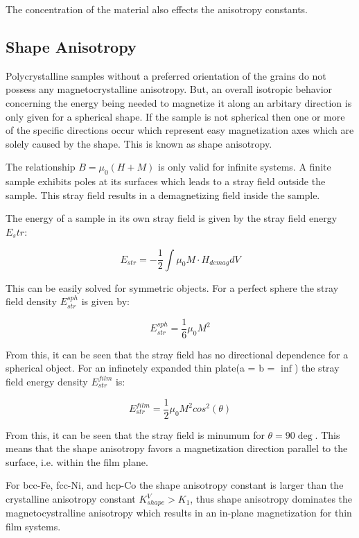 \documentclass[10pt]{article} %
\begin{document}
The concentration of the material also effects the anisotropy constants.


\subsection{Shape Anisotropy}
Polycrystalline samples without a preferred orientation of the grains do not possess any magnetocrystalline anisotropy. But, an overall isotropic behavior concerning the energy being needed to magnetize it along an arbitary direction is only given for a spherical shape. If the sample is not spherical then one or more of the specific directions occur which represent easy magnetization axes which are solely caused by the shape. This is known as shape anisotropy.

The relationship $B = \mu_0\left (H + M\right )$ is only valid for infinite systems. A finite sample exhibits poles at its surfaces which leads to a stray field outside the sample. This stray field results in a demagnetizing field inside the sample.

The energy of a sample in its own stray field is given by the stray field energy $E_str$:

\begin{equation}
E_{str} = - \frac{1}{2} \int \mu_0 M \cdot H_{demag} dV
\end{equation}

This can be easily solved for symmetric objects. For a perfect sphere the stray field density $E_{str}^{sph}$ is given by:

\begin{equation}
E_{str}^{sph} = \frac{1}{6} \mu_0 M^2
\end{equation}

From this, it can be seen that the stray field has no directional dependence for a spherical object. For an infinetely expanded thin plate(a = b = $\inf$) the stray field energy density $E_{str}^{film}$ is:

\begin{equation}
E_{str}^{film} = \frac{1}{2} \mu_0 M^2 cos^2 \left ( \theta \right )
\end{equation}

From this, it can be seen that the stray field is minumum for $\theta = 90 \deg$. This means that the shape anisotropy favors a magnetization direction parallel to the surface, i.e. within the film plane.

For bcc-Fe, fcc-Ni, and hcp-Co the shape anisotropy constant is larger than the crystalline anisotropy constant $K_{shape}^V > K_1$, thus shape anisotropy dominates the magnetocystralline anisotropy which results in an in-plane magnetization for thin film systems.
\end{document}
